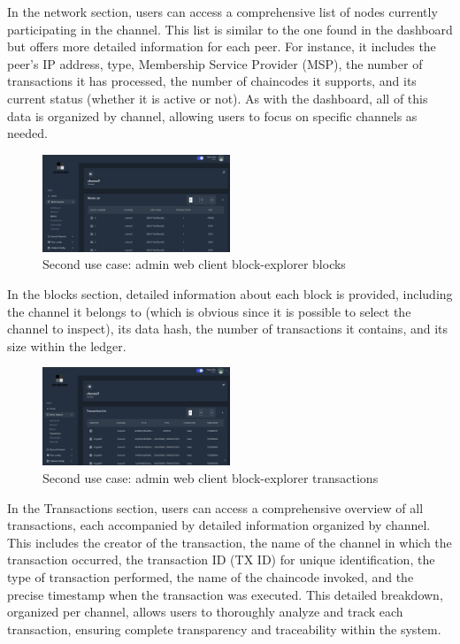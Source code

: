 In the network section, users can access a comprehensive list of nodes currently participating in the channel. This list is similar to the one found in the dashboard but offers more detailed information for each peer. For instance, it includes the peer's IP address, type, Membership Service Provider (MSP), the number of transactions it has processed, the number of chaincodes it supports, and its current status (whether it is active or not). As with the dashboard, all of this data is organized by channel, allowing users to focus on specific channels as needed.

\begin{figure}[H]
    \centering
    \includegraphics[width=0.5\textwidth]{assets/use-case-2/block-explorer-blocks.png} %
    \caption{Second use case: admin web client block-explorer blocks}
    \label{fig:sample-image} 
\end{figure}

In the blocks section, detailed information about each block is provided, including the channel it belongs to (which is obvious since it is possible to select the channel to inspect), its data hash, the number of transactions it contains, and its size within the ledger.

\begin{figure}[H]
    \centering
    \includegraphics[width=0.5\textwidth]{assets/use-case-2/block-explorer-transactions.png} %
    \caption{Second use case: admin web client block-explorer transactions}
    \label{fig:sample-image} 
\end{figure}

In the Transactions section, users can access a comprehensive overview of all transactions, each accompanied by detailed information organized by channel. This includes the creator of the transaction, the name of the channel in which the transaction occurred, the transaction ID (TX ID) for unique identification, the type of transaction performed, the name of the chaincode invoked, and the precise timestamp when the transaction was executed. This detailed breakdown, organized per channel, allows users to thoroughly analyze and track each transaction, ensuring complete transparency and traceability within the system.

